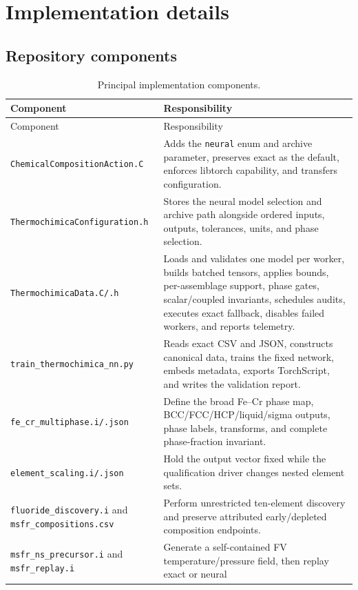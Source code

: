 \documentclass[11pt]{article}
\newcommand{\code}[1]{\texttt{#1}}
\begin{document}
\section{Implementation details}

\subsection{Repository components}

\begin{longtable}{L{0.36\textwidth}L{0.56\textwidth}}
  \caption{Principal implementation components.}
  \label{tab:components}\\
  \toprule
  Component & Responsibility \\
  \midrule
  \endfirsthead
  \toprule
  Component & Responsibility \\
  \midrule
  \endhead
  \code{ChemicalCompositionAction.C} &
  Adds the \code{neural} enum and archive parameter, preserves exact as the default, enforces
  libtorch capability, and transfers configuration. \\
  \code{ThermochimicaConfiguration.h} &
  Stores the neural model selection and archive path alongside ordered inputs, outputs,
  tolerances, units, and phase selection. \\
  \code{ThermochimicaData.C/.h} &
  Loads and validates one model per worker, builds batched tensors, applies bounds,
  per-assemblage support, phase gates, scalar/coupled invariants, schedules audits, executes exact
  fallback, disables failed workers, and reports telemetry. \\
  \code{train\_thermochimica\_nn.py} &
  Reads exact CSV and JSON, constructs canonical data, trains the fixed network, embeds metadata,
  exports TorchScript, and writes the validation report. \\
  \code{fe\_cr\_multiphase.i/.json} &
  Define the broad Fe--Cr phase map, BCC/FCC/HCP/liquid/sigma outputs, phase labels, transforms,
  and complete phase-fraction invariant. \\
  \code{element\_scaling.i/.json} &
  Hold the output vector fixed while the qualification driver changes nested element sets. \\
  \code{fluoride\_discovery.i} and \code{msfr\_compositions.csv} &
  Perform unrestricted ten-element discovery and preserve attributed early/depleted composition
  endpoints. \\
  \code{msfr\_ns\_precursor.i} and \code{msfr\_replay.i} &
  Generate a self-contained FV temperature/pressure field, then replay exact or neural

\end{longtable}
\end{document}
